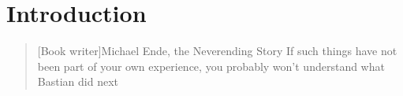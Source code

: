 \chapter{Introduction}
\label{sec:introduction}

\begin{quotation}[Book writer]{Michael Ende, the Neverending Story} 
If such things have not been part of your own experience, you probably won't understand what Bastian did next



\end{quotation}

